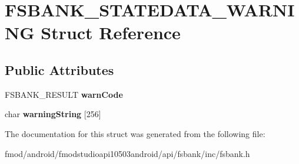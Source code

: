 \hypertarget{struct_f_s_b_a_n_k___s_t_a_t_e_d_a_t_a___w_a_r_n_i_n_g}{\section{F\+S\+B\+A\+N\+K\+\_\+\+S\+T\+A\+T\+E\+D\+A\+T\+A\+\_\+\+W\+A\+R\+N\+I\+N\+G Struct Reference}
\label{struct_f_s_b_a_n_k___s_t_a_t_e_d_a_t_a___w_a_r_n_i_n_g}
}
\subsection*{Public Attributes}
\begin{DoxyCompactItemize}
\item 
\hypertarget{struct_f_s_b_a_n_k___s_t_a_t_e_d_a_t_a___w_a_r_n_i_n_g_a9315c960f325893db8b47b1e755d1a83}{F\+S\+B\+A\+N\+K\+\_\+\+R\+E\+S\+U\+L\+T {\bfseries warn\+Code}}\label{struct_f_s_b_a_n_k___s_t_a_t_e_d_a_t_a___w_a_r_n_i_n_g_a9315c960f325893db8b47b1e755d1a83}

\item 
\hypertarget{struct_f_s_b_a_n_k___s_t_a_t_e_d_a_t_a___w_a_r_n_i_n_g_abc7d4c79b289933262e9f126c9747473}{char {\bfseries warning\+String} \mbox{[}256\mbox{]}}\label{struct_f_s_b_a_n_k___s_t_a_t_e_d_a_t_a___w_a_r_n_i_n_g_abc7d4c79b289933262e9f126c9747473}

\end{DoxyCompactItemize}


The documentation for this struct was generated from the following file\+:\begin{DoxyCompactItemize}
\item 
fmod/android/fmodstudioapi10503android/api/fsbank/inc/fsbank.\+h\end{DoxyCompactItemize}

